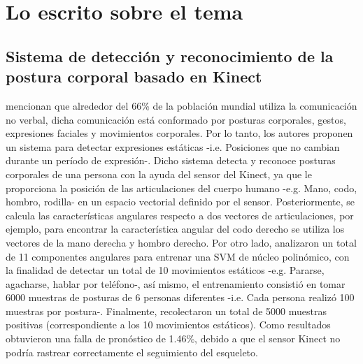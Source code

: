 \newpage 
\section{Lo escrito sobre el tema} \label{tr}
\subsection{Sistema de detecci\'on y reconocimiento de la postura corporal basado en Kinect} \label{tr:1}
 mencionan que alrededor del 66\% de la poblaci\'on mundial utiliza la comunicaci\'on no verbal, dicha comunicaci\'on est\'a conformado por posturas corporales, gestos, expresiones faciales y movimientos corporales. Por lo tanto, los autores proponen un sistema para detectar expresiones est\'aticas -i.e. Posiciones que no cambian durante un per\'iodo de expresi\'on-.
\medbreak
Dicho sistema detecta y reconoce posturas corporales de una persona con la ayuda del sensor del Kinect, ya que le proporciona la posici\'on de las articulaciones del cuerpo humano -e.g. Mano, codo, hombro, rodilla- en un espacio vectorial definido por el sensor. Posteriormente, se calcula las caracter\'isticas angulares respecto a dos vectores de articulaciones, por ejemplo, para encontrar la caracter\'istica angular del codo derecho se utiliza los vectores de la mano derecha y hombro derecho.
\medbreak
Por otro lado,  analizaron un total de 11 componentes angulares para entrenar una \acrfull{SVM} de n\'ucleo polin\'omico, con la finalidad de detectar un total de 10 movimientos est\'aticos -e.g. Pararse, agacharse, hablar por tel\'efono-, as\'i mismo, el entrenamiento consisti\'o en tomar 6000 muestras de posturas de 6 personas diferentes -i.e. Cada persona realiz\'o 100 muestras por postura-.
\medbreak
Finalmente,  recolectaron un total de 5000 muestras positivas (correspondiente a los 10 movimientos est\'aticos).  Como resultados obtuvieron una falla de pron\'ostico de 1.46\%, debido a que el sensor Kinect no podr\'ia rastrear correctamente el seguimiento del esqueleto.
